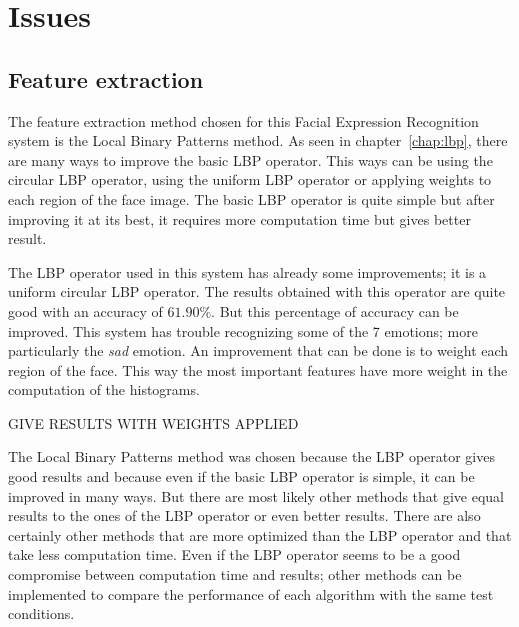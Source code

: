 \chapter{Issues}
\label{chap:eval_issues}

\section{Feature extraction}

\vspace{\baselineskip}
\noindent The feature extraction method chosen for this Facial Expression Recognition system is the Local Binary Patterns method. As seen in chapter~\ref{chap:lbp}, there are many ways to improve the basic LBP operator. This ways can be using the circular LBP operator, using the uniform LBP operator or applying weights to each region of the face image. The basic LBP operator is quite simple but after improving it at its best, it requires more computation time but gives better result.
\newline

\noindent The LBP operator used in this system has already some improvements; it is a uniform circular LBP operator. The results obtained with this operator are quite good with an accuracy of $ 61.90\% $. But this percentage of accuracy can be improved. This system has trouble recognizing some of the 7 emotions; more particularly the \textit{sad} emotion. An improvement that can be done is to weight each region of the face. This way the most important features have more weight in the computation of the histograms.
\newline

\noindent GIVE RESULTS WITH WEIGHTS APPLIED
\newline

\noindent The Local Binary Patterns method was chosen because the LBP operator gives good results and because even if the basic LBP operator is simple, it can be improved in many ways. But there are most likely other methods that give equal results to the ones of the LBP operator or even better results. There are also certainly other methods that are more optimized than the LBP operator and that take less computation time. Even if the LBP operator seems to be a good compromise between computation time and results; other methods can be implemented to compare the performance of each algorithm with the same test conditions.
\newline

